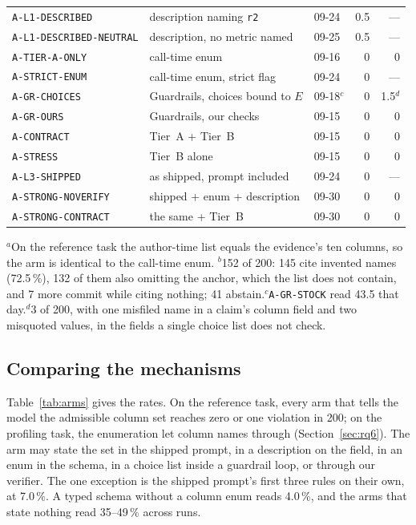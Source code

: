 \documentclass[journal]{IEEEtran}
\begin{document}
\begin{table}[!htbp]
{\begin{tabular}{@{}lllrr@{}}
\texttt{A-L1-DESCRIBED}      & description naming \texttt{r2} & 09-24 & 0.5 & --- \\
\texttt{A-L1-DESCRIBED-NEUTRAL} & description, no metric named & 09-25 & 0.5 & --- \\
\texttt{A-TIER-A-ONLY}       & call-time enum             & 09-16 & 0 & 0 \\
\texttt{A-STRICT-ENUM}       & call-time enum, strict flag & 09-24 & 0 & --- \\
\texttt{A-GR-CHOICES}        & Guardrails, choices bound to $E$ & 09-18$^{c}$ & 0 & 1.5$^{d}$ \\
\midrule
\texttt{A-GR-OURS}           & Guardrails, our checks     & 09-15 & 0 & 0 \\
\texttt{A-CONTRACT}          & Tier~A + Tier~B            & 09-15 & 0 & 0 \\
\texttt{A-STRESS}            & Tier~B alone               & 09-15 & 0 & 0 \\
\texttt{A-L3-SHIPPED}        & as shipped, prompt included & 09-24 & 0 & --- \\
\midrule
\texttt{A-STRONG-NOVERIFY}   & shipped + enum + description & 09-30 & 0 & 0 \\
\texttt{A-STRONG-CONTRACT}   & the same + Tier~B          & 09-30 & 0 & 0 \\
\bottomrule
\end{tabular}}

\vspace{2pt}
{\footnotesize $^{a}$On the reference task the author-time list equals the
evidence's ten columns, so the arm is identical to the call-time enum.\quad
$^{b}$152 of 200: 145 cite invented names (72.5\,\%), 132 of them also
omitting the anchor, which the list does not contain, and 7 more commit while
citing nothing; 41 abstain.\quad $^{c}$\texttt{A-GR-STOCK} read
43.5 that day.\quad $^{d}$3 of 200, with one misfiled name in a claim's column
field and two misquoted values, in the fields a single choice list does not
check.}
\end{table}

\subsection{Comparing the mechanisms}

Table~\ref{tab:arms} gives the rates. On the reference task, every arm that
tells the model the admissible column set reaches zero or one violation in 200;
on the profiling task, the enumeration let column names through
(Section~\ref{sec:rq6}). The arm
may state the set in the shipped prompt, in a description on the field, in an
enum in the schema, in a choice list inside a guardrail loop, or through our
verifier. The one exception is the shipped prompt's first three rules on their
own, at 7.0\,\%. A typed schema without a column enum reads 4.0\,\%, and the
arms that state nothing read 35--49\,\% across runs.
\end{document}
